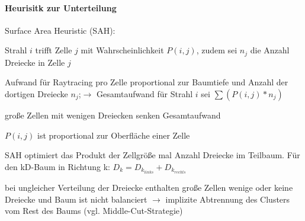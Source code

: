 \documentclass[landscape]{article}
\begin{document}
\begin{multicols}{3}
  \paragraph*{Heurisitk zur Unterteilung}
  \begin{itemize*}
    \item Surface Area Heuristic (SAH):
    \begin{itemize*}
      \item Strahl $i$ trifft Zelle $j$ mit Wahrscheinlichkeit $P(i,j)$, zudem sei $n_j$ die Anzahl Dreiecke in Zelle $j$
      \item Aufwand für Raytracing pro Zelle proportional zur Baumtiefe und Anzahl der dortigen Dreiecke $n_j$;$\rightarrow$ Gesamtaufwand für Strahl $i$ sei  $\sum(P(i,j)*n_j)$
    \end{itemize*}
    \item große Zellen mit wenigen Dreiecken senken Gesamtaufwand
    \item $P(i,j)$ ist proportional zur Oberfläche einer Zelle
    \item SAH optimiert das Produkt der Zellgröße mal Anzahl Dreiecke im Teilbaum. Für den kD-Baum in Richtung k: $D_k = D_{k_{links}} + D_{k_{rechts}}$
    \item bei ungleicher Verteilung der Dreiecke enthalten große Zellen wenige oder keine Dreiecke und Baum ist nicht balanciert $\rightarrow$ implizite Abtrennung des Clusters vom Rest des Baums (vgl. Middle-Cut-Strategie)
  \end{itemize*}
  

\end{multicols}
\end{document}
